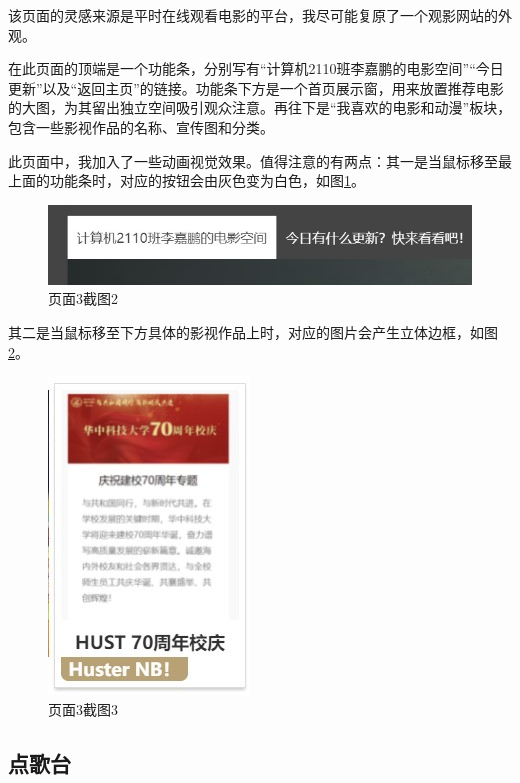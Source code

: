 \documentclass[supercite]{Experimental_Report}
\theoremstyle{definition}
\begin{document}
	该页面的灵感来源是平时在线观看电影的平台，我尽可能复原了一个观影网站的外观。
	
	在此页面的顶端是一个功能条，分别写有“计算机2110班李嘉鹏的电影空间”“今日更新”以及“返回主页”的链接。功能条下方是一个首页展示窗，用来放置推荐电影的大图，为其留出独立空间吸引观众注意。再往下是“我喜欢的电影和动漫”板块，包含一些影视作品的名称、宣传图和分类。
	
	此页面中，我加入了一些动画视觉效果。值得注意的有两点：其一是当鼠标移至最上面的功能条时，对应的按钮会由灰色变为白色，如图\ref{fig3-5}。
	
	\begin{figure}[htb]
		\begin{center}
			\includegraphics[scale=1.20]{images/3-5.jpg}
			\caption{页面3截图2}
			\label{fig3-5}
		\end{center}
	\end{figure}
	
	其二是当鼠标移至下方具体的影视作品上时，对应的图片会产生立体边框，如图\ref{fig3-6}。

    \begin{figure}[htb]
    	\begin{center}
    		\includegraphics[scale=1.3]{images/3-6.jpg}
    		\caption{页面3截图3}
    		\label{fig3-6}
    	\end{center}
    \end{figure}
	
	
	\subsection{点歌台}
	
\end{document}
